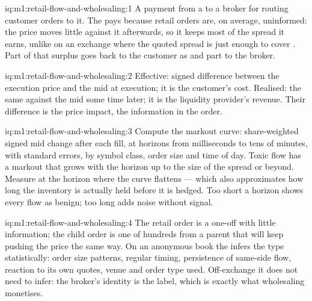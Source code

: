 \begin{solution}{iq:m1:retail-flow-and-wholesaling:1}
A payment from a  to a broker for routing customer orders to it.
The  pays because retail orders are, on average, uninformed: the
price moves little against it afterwards, so it keeps most of the spread it
earns, unlike on an exchange where the quoted spread is just enough to cover
. Part of that surplus goes back to the customer as  and part to the broker.
\end{solution}

\begin{solution}{iq:m1:retail-flow-and-wholesaling:2}
Effective: signed difference between the execution price and the mid at
execution; it is the customer's cost. Realised: the same against the mid
some time later; it is the liquidity provider's revenue. Their difference is
the price impact, the information in the order.
\end{solution}

\begin{solution}{iq:m1:retail-flow-and-wholesaling:3}
Compute the markout curve: share-weighted signed mid change after each fill,
at horizons from milliseconds to tens of minutes, with standard errors, by
symbol class, order size and time of day. Toxic flow has a markout that
grows with the horizon up to the size of the spread or beyond. Measure at the
horizon where the curve flattens --- which also approximates how long the
inventory is actually held before it is hedged. Too short a horizon shows
every flow as benign; too long adds noise without signal.
\end{solution}

\begin{solution}{iq:m1:retail-flow-and-wholesaling:4}
The retail order is a one-off with little information; the child order is
one of hundreds from a parent that will keep pushing the price the same way.
On an anonymous book the  infers the type statistically: order
size patterns, regular timing, persistence of same-side flow, reaction to its
own quotes, venue and order type used. Off-exchange it does not need to
infer: the broker's identity is the label, which is exactly what wholesaling
monetises.
\end{solution}

